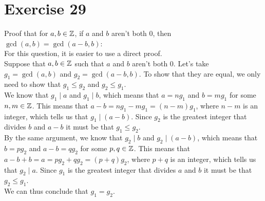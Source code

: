 \documentclass[12pt]{article}
\begin{document}
    \section*{Exercise 29}
    Proof that for $a, b \in \mathbb{Z}$,
    if $a$ and $b$ aren't both $0$,
    then $\gcd(a, b) = \gcd(a-b, b)$: \\
    For this question, it is easier to use a direct proof. \\
    Suppose that $a, b \in \mathbb{Z}$
    such that $a$ and $b$ aren't both $0$.
    Let's take $g_1 = \gcd(a, b)$ and $g_2 = \gcd(a - b, b)$.
    To show that they are equal,
    we only need to show that $g_1 \leqslant g_2$
    and $g_2 \leqslant g_1$. \\
    We know that $g_1 \mid a$ and $g_1 \mid b$,
    which means that $a = ng_1$ and $b = mg_1$
    for some $n, m \in \mathbb{Z}$.
    This means that $a - b = ng_1 - mg_1 = (n-m)g_1$,
    where $n-m$ is an integer,
    which tells us that $g_1 \mid (a-b)$.
    Since $g_2$ is the greatest integer that
    divides $b$ and $a-b$
    it must be that $g_1 \leqslant g_2$. \\
    By the same argument,
    we know that $g_2 \mid b$ and $g_2 \mid (a-b)$,
    which means that $b = pg_2$ and $a-b = qg_2$
    for some $p, q \in \mathbb{Z}$.
    This means that $a - b + b = a = pg_2 + qg_2 = (p+q)g_2$,
    where $p+q$ is an integer,
    which tells us that $g_2 \mid a$.
    Since $g_1$ is the greatest integer that
    divides $a$ and $b$
    it must be that $g_2 \leqslant g_1$. \\
    We can thus conclude that $g_1 = g_2$. \\
\end{document}
